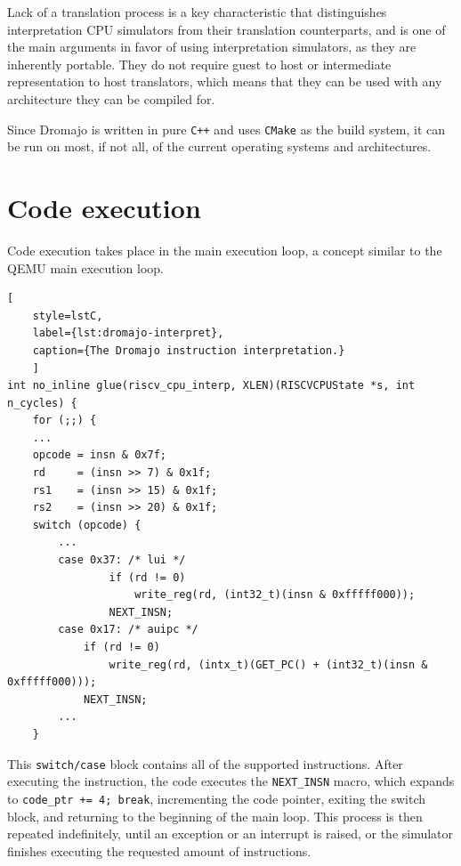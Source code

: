 Lack of a translation process is a key characteristic that distinguishes interpretation CPU simulators from their
translation counterparts, and is one of the main arguments in favor of using interpretation simulators, as they
are inherently portable. They do not require guest to host or intermediate representation to host translators, which
means that they can be used with any architecture they can be compiled for.

Since Dromajo is written in pure \texttt{C++} and uses \texttt{CMake} as the build system, it can be run on most, if not all,
of the current operating systems and architectures.

\pagebreak

\section{Code execution}

Code execution takes place in the main execution loop, a concept similar to the QEMU main execution loop.

\begin{lstlisting}[
    style=lstC,
    label={lst:dromajo-interpret},
    caption={The Dromajo instruction interpretation.}
    ]
int no_inline glue(riscv_cpu_interp, XLEN)(RISCVCPUState *s, int n_cycles) {
    for (;;) {
    ...
    opcode = insn & 0x7f;
    rd     = (insn >> 7) & 0x1f;
    rs1    = (insn >> 15) & 0x1f;
    rs2    = (insn >> 20) & 0x1f;
    switch (opcode) {
        ...
        case 0x37: /* lui */
                if (rd != 0)
                    write_reg(rd, (int32_t)(insn & 0xfffff000));
                NEXT_INSN;
        case 0x17: /* auipc */
            if (rd != 0)
                write_reg(rd, (intx_t)(GET_PC() + (int32_t)(insn & 0xfffff000)));
            NEXT_INSN;
        ...
    }
\end{lstlisting}

\noindent
This \texttt{switch/case} block contains all of the supported instructions. After executing the instruction, the code
executes the \texttt{NEXT\_INSN} macro, which expands to \texttt{code\_ptr += 4; break}, incrementing the code pointer,
exiting the switch block, and returning to the beginning of the main loop. This process is then repeated indefinitely,
until an exception or an interrupt is raised, or the simulator finishes executing the requested amount of
instructions.

